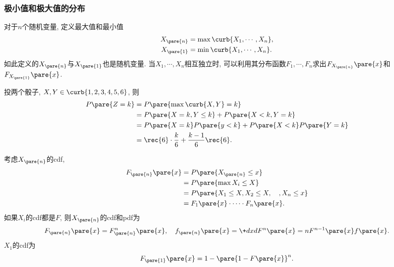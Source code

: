 \documentclass[../Statistics.tex]{subfiles}
\begin{document}

\subsubsection{极小值和极大值的分布} %
\label{ssub:极小值和极大值的分布}

对于$n$个随机变量, 定义最大值和最小值
\begin{align*}
    X_{\pare{n}} &= \max\curb{X_1,\cdots,X_n}, \\
    X_{\pare{1}} &= \min\curb{X_1,\cdots,X_n}.
\end{align*}
如此定义的$X_{\pare{n}}$与$X_{\pare{1}}$也是随机变量. 当$X_1,\cdots,X_n$相互独立时, 可以利用其分布函数$F_1,\cdots,F_n$求出$F_{X_{\pare{n}}}\pare{x}$和$F_{X_{\pare{1}}}\pare{x}$.
\begin{ex}
    投两个骰子, $X,Y\in \curb{1,2,3,4,5,6}$, 则
    \begin{align*}
        P\pare{Z=k} &= P\pare{\max\curb{X,Y} = k} \\
        &= P\pare{X=k,Y\le k} + P\pare{X<k,Y=k} \\
        &= P\pare{X=k}P\pare{y<k} + P\pare{X<k}P\pare{Y=k} \\
        &= \rec{6}\cdot\frac{k}{6} + \frac{k-1}{6}\rec{6}.
    \end{align*}
\end{ex}
考虑$X_{\pare{n}}$的cdf,
\begin{align*}
    F_{\pare{n}}\pare{x} &= P\pare{X_{\pare{n}}\le x} \\
    &= P\pare{\max X_i \le X} \\
    &= P\pare{X_1\le X,X_2\le X,\quad, X_n \le x} \\
    &= F_1\pare{x} \cdot\cdots\cdot F_n\pare{x}.
\end{align*}
如果$X_i$的cdf都是$F$, 则$X_{\pare{n}}$的cdf和pdf为
\[ F_{\pare{n}}\pare{x} = F_{\pare{n}}^n \pare{x},\quad f_{\pare{n}}\pare{x} = \+dxd{} F^n\pare{x} = nF^{n-1}\pare{x}f\pare{x}. \]
$X_1$的cdf为
\[ F_{\pare{1}}\pare{x} = 1-\pare{1-F\pare{x}}^n. \]
\end{document}
